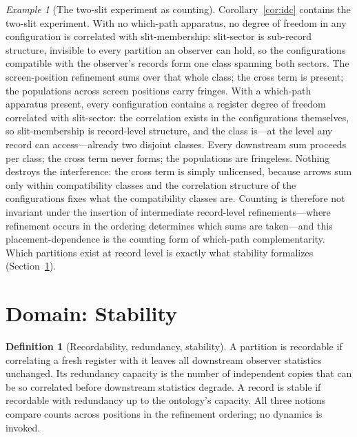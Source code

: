 \documentclass[11pt]{article}
\theoremstyle{definition}
\newtheorem{definition}{Definition}
\theoremstyle{remark}
\newtheorem*{example*}{Example}
\begin{document}
\begin{example*}[The two-slit experiment as counting]
Corollary~\ref{cor:idc} contains the two-slit experiment. With no which-path apparatus, no degree of freedom in any configuration is correlated with slit-membership: slit-sector is sub-record structure, invisible to every partition an observer can hold, so the configurations compatible with the observer's records form one class spanning both sectors. The screen-position refinement sums over that whole class; the cross term is present; the populations across screen positions carry fringes. With a which-path apparatus present, every configuration contains a register degree of freedom correlated with slit-sector: the correlation exists in the configurations themselves, so slit-membership is record-level structure, and the class is---at the level any record can access---already two disjoint classes. Every downstream sum proceeds per class; the cross term never forms; the populations are fringeless. Nothing destroys the interference: the cross term is simply unlicensed, because arrows sum only within compatibility classes and the correlation structure of the configurations fixes what the compatibility classes are. Counting is therefore not invariant under the insertion of intermediate record-level refinements---where refinement occurs in the ordering determines which sums are taken---and this placement-dependence is the counting form of which-path complementarity. Which partitions exist at record level is exactly what stability formalizes (Section~\ref{sec:stab}).
\end{example*}

\section{Domain: Stability}\label{sec:stab}

\begin{definition}[Recordability, redundancy, stability]\label{def:stability}
A partition is recordable if correlating a fresh register with it leaves all downstream observer statistics unchanged. Its redundancy capacity is the number of independent copies that can be so correlated before downstream statistics degrade. A record is stable if recordable with redundancy up to the ontology's capacity. All three notions compare counts across positions in the refinement ordering; no dynamics is invoked.
\end{definition}
\end{document}
